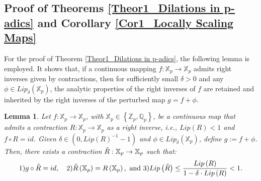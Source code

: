 \documentclass[a4paper, 12pt]{article}
\newtheorem{lemma}[theorem]{Lemma}
\theoremstyle{definition}
\begin{document}
	
	\subsection{ Proof of Theorems \ref{Theor1_Dilations in p-adics} and Corollary \ref{Cor1_Locally Scaling Maps}}\label{Sec_Proof of Theorem Right Inverse}
	
	
	For the proof of Theorem \ref{Theor1_Dilations in p-adics}, the following lemma is employed. It shows that, if a continuous mapping $f: \mathbb{X}_{p} \to \mathbb{X}_{p}$ admits right inverses given by contractions, then for sufficiently small $\delta > 0$ and any $\phi \in Lip_{\delta} \left(  \mathbb{X}_{p}  \right) $, the analytic properties of the right inverses of $f$ are retained and inherited by the right inverses of the perturbed map $g = f + \phi$.  
	
	
	
	\begin{lemma}\label{Lem1_Right Inverse of Noises}
		Let $f:\mathbb{X}_p \to \mathbb{X}_p$, with $\mathbb{X}_{p} \in  \left\{  \mathbb{Z}_{p}, \mathbb{Q}_{p}  \right\} $, be a continuous map that admits a contraction $R:\mathbb{X}_p \to \mathbb{X}_p$ as a right inverse, i.e., $Lip \left(  R  \right)  <1$ and $f\circ R = id $.
		Given $ \delta \in  \left(  0,  Lip \left(  R  \right) ^{-1} - 1  \right)  $ and $\phi \in       Lip_{\delta} \left(  \mathbb{X}_{p}  \right) $, define $ g :=   f + \phi $. 
		Then, there exists a contraction $\Tilde{R} : \mathbb{X}_{p} \to \mathbb{X}_{p}$          such that: 
		\begin{equation}\label{Eq1_Right Inverse}
			\text{1)}   g \circ \Tilde{R}   =   id,  \quad \text{2)}    \Tilde{R}  \left(  \mathbb{X}_{p}  \right)    =   R \left(  \mathbb{X}_{p}  \right) ,   \text{ and 3)}   Lip \left(  \Tilde{R}  \right)    \le   {Lip \left(  R  \right)   \over 1 - \delta \cdot Lip \left(  R  \right)  }  <   1.
		\end{equation}
		
	\end{lemma}
	
	
	
\end{document}
